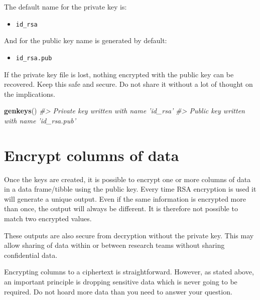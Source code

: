 \documentclass[
  12pt,
  krantz2]{krantz}
\makeatletter
\newenvironment{Shaded}{\begin{snugshade}}{\end{snugshade}}
\newcommand{\CommentTok}[1]{\textcolor[rgb]{0.56,0.35,0.01}{\textit{#1}}}
\newcommand{\KeywordTok}[1]{\textcolor[rgb]{0.13,0.29,0.53}{\textbf{#1}}}
\newcommand{\NormalTok}[1]{#1}
\providecommand{\tightlist}{%
  \setlength{\itemsep}{0pt}\setlength{\parskip}{0pt}}
\newenvironment{kframe}{%
\medskip{}
\setlength{\fboxsep}{.8em}
 \def\at@end@of@kframe{}%
 \ifinner\ifhmode%
  \def\at@end@of@kframe{\end{minipage}}%
  \begin{minipage}{\columnwidth}%
 \fi\fi%
 \def\FrameCommand##1{\hskip\@totalleftmargin \hskip-\fboxsep
 \colorbox{shadecolor}{##1}\hskip-\fboxsep
     \hskip-\linewidth \hskip-\@totalleftmargin \hskip\columnwidth}%
 \MakeFramed {\advance\hsize-\width
   \@totalleftmargin\z@ \linewidth\hsize
   \@setminipage}}%
 {\par\unskip\endMakeFramed%
 \at@end@of@kframe}
\renewenvironment{Shaded}{\begin{kframe}}{\end{kframe}}
\makeatother
\begin{document}
The default name for the private key is:

\begin{itemize}
\tightlist
\item
  \texttt{id\_rsa}
\end{itemize}

And for the public key name is generated by default:

\begin{itemize}
\tightlist
\item
  \texttt{id\_rsa.pub}
\end{itemize}

If the private key file is lost, nothing encrypted with the public key can be recovered.
Keep this safe and secure.
Do not share it without a lot of thought on the implications.

\begin{Shaded}
\begin{Highlighting}[]
\KeywordTok{genkeys}\NormalTok{()}
\CommentTok{#> Private key written with name 'id_rsa'}
\CommentTok{#> Public key written with name 'id_rsa.pub'}
\end{Highlighting}
\end{Shaded}

\hypertarget{encrypt-columns-of-data}{%
\section{Encrypt columns of data}\label{encrypt-columns-of-data}}


Once the keys are created, it is possible to encrypt one or more columns of data in a data frame/tibble using the public key.
Every time RSA encryption is used it will generate a unique output.
Even if the same information is encrypted more than once, the output will always be different.
It is therefore not possible to match two encrypted values.

These outputs are also secure from decryption without the private key.
This may allow sharing of data within or between research teams without sharing confidential data.

Encrypting columns to a ciphertext is straightforward.
However, as stated above, an important principle is dropping sensitive data which is never going to be required.
Do not hoard more data than you need to answer your question.
\end{document}
